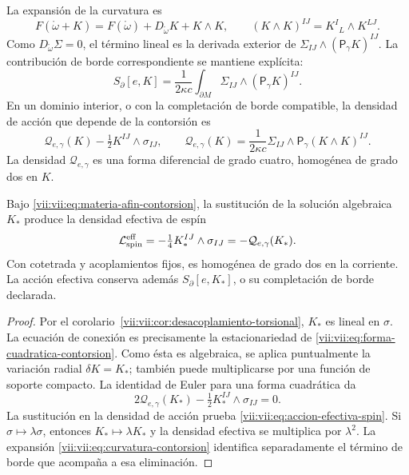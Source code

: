 La expansión de la curvatura es
\begin{equation}
 F(\mathring\omega+K)
 =F(\mathring\omega)+D_{\mathring\omega}K+K\wedge K,
 \qquad (K\wedge K)^{IJ}=K^I{}_{L}\wedge K^{LJ}.
 \label{vii:vii:eq:curvatura-contorsion}
\end{equation}
Como \(D_{\mathring\omega}\Sigma=0\), el término lineal es la
derivada exterior de \(\Sigma_{IJ}\wedge(\mathsf P_\gamma K)^{IJ}\).
La contribución de borde correspondiente se mantiene explícita:
\begin{equation}
 S_\partial[e,K]=\frac1{2\kappa c}
     \int_{\partial M}\Sigma_{IJ}\wedge(\mathsf P_\gamma K)^{IJ}.
 \label{vii:vii:eq:borde-contorsion}
\end{equation}
En un dominio interior, o con la completación de borde compatible,
la densidad de acción que depende de la contorsión es
\begin{equation}
 \mathcal Q_{e,\gamma}(K)-\tfrac12K^{IJ}\wedge\sigma_{IJ},
 \qquad
 \mathcal Q_{e,\gamma}(K)
  =\frac1{2\kappa c}\Sigma_{IJ}\wedge
                         \mathsf P_\gamma(K\wedge K)^{IJ}.
 \label{vii:vii:eq:forma-cuadratica-contorsion}
\end{equation}
La densidad \(\mathcal Q_{e,\gamma}\) es una forma diferencial de
grado cuatro, homogénea de grado dos en \(K\).

\begin{theorem}
\label{vii:vii:thm:respuesta-cuadratica}
Bajo \eqref{vii:vii:eq:materia-afin-contorsion}, la sustitución de la
solución algebraica \(K_*\) produce la densidad efectiva de espín
\begin{equation}
 \mathcal L_{\rm spin}^{\rm eff}
 =-\tfrac14 K_*^{IJ}\wedge\sigma_{IJ}
 =-\mathcal Q_{e,\gamma}(K_*).
 \label{vii:vii:eq:accion-efectiva-spin}
\end{equation}
Con cotetrada y acoplamientos fijos, es homogénea de grado dos en
la corriente. La acción efectiva conserva además
\(S_\partial[e,K_*]\), o su completación de borde declarada.
\end{theorem}
\begin{proof}
Por el corolario~\ref{vii:vii:cor:desacoplamiento-torsional},
\(K_*\) es lineal en \(\sigma\). La ecuación de conexión es
precisamente la estacionariedad de
\eqref{vii:vii:eq:forma-cuadratica-contorsion}. Como ésta es algebraica,
se aplica puntualmente la variación radial \(\delta K=K_*\);
también puede multiplicarse por una función de soporte compacto.
La identidad de Euler para una forma cuadrática da
\[
 2\mathcal Q_{e,\gamma}(K_*)
             -\tfrac12K_*^{IJ}\wedge\sigma_{IJ}=0.
\]
La sustitución en la densidad de acción prueba
\eqref{vii:vii:eq:accion-efectiva-spin}. Si
\(\sigma\mapsto\lambda\sigma\), entonces
\(K_*\mapsto\lambda K_*\) y la densidad efectiva se multiplica
por \(\lambda^2\). La expansión
\eqref{vii:vii:eq:curvatura-contorsion} identifica separadamente el
término de borde que acompaña a esa eliminación.
\end{proof}

